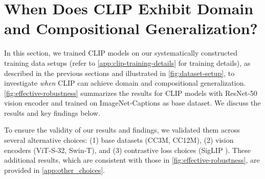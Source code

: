 \section{When Does CLIP Exhibit Domain and Compositional Generalization?}\label{sec:exp_when}
In this section, we trained CLIP models on our systematically constructed training data setups (refer to \cref{app:clip-training-details} for training details), as described in the previous sections and illustrated in \cref{fig:dataset-setup}, to investigate \emph{when} CLIP can achieve domain and compositional generalization. \cref{fig:effective-robustness} summarizes the results for CLIP models with ResNet-50 vision encoder and trained on ImageNet-Captions as base dataset. We discuss the results and key findings below. 

To ensure the validity of our results and findings, we validated them across several alternative choices: (1) base datasets (CC3M, CC12M), (2) vision encoders (ViT-S-32, Swin-T), and (3) contrastive loss choices (SigLIP \citep{zhai2023sigmoid}). These additional results, which are consistent with those in \cref{fig:effective-robustness}, are provided in \cref{app:other_choices}.

